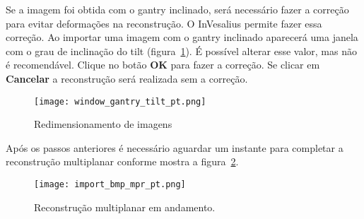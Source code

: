 Se a imagem foi obtida com o gantry inclinado, será necessário fazer a correção para evitar deformações na reconstrução. O InVesalius permite fazer essa correção. Ao importar uma imagem com o gantry inclinado aparecerá uma janela com o grau de inclinação do tilt (figura~\ref{fig:gantry_tilt}). É possível alterar esse valor, mas não é recomendável. Clique no botão \textbf{OK} para fazer a correção. Se clicar em \textbf{Cancelar} a reconstrução será realizada sem a correção.

\begin{figure}[!htb]
\centering
\texttt{[image: window\_gantry\_tilt\_pt.png]}
\caption{Redimensionamento de imagens}
\label{fig:gantry_tilt}
\end{figure}

Após os passos anteriores é necessário aguardar um instante para completar a reconstrução multiplanar conforme mostra a figura~\ref{fig:import_bmp_mpr_pt.png}.

\begin{figure}[!htb]
\centering
\texttt{[image: import\_bmp\_mpr\_pt.png]}
\caption{Reconstrução multiplanar em andamento.}
\label{fig:import_bmp_mpr_pt.png}
\end{figure}
